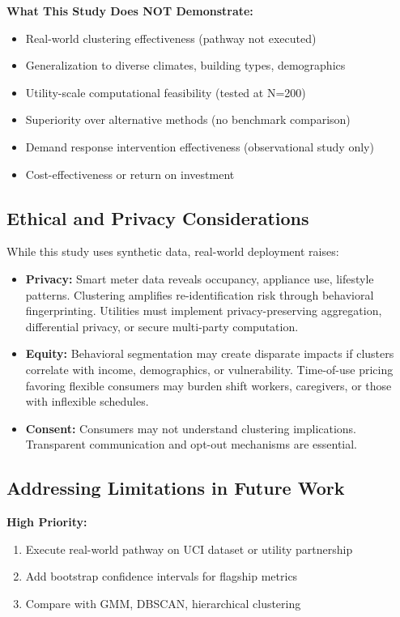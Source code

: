 \textbf{What This Study Does NOT Demonstrate:}
\begin{itemize}
    \item Real-world clustering effectiveness (pathway not executed)
    \item Generalization to diverse climates, building types, demographics
    \item Utility-scale computational feasibility (tested at N=200)
    \item Superiority over alternative methods (no benchmark comparison)
    \item Demand response intervention effectiveness (observational study only)
    \item Cost-effectiveness or return on investment
\end{itemize}

\subsection{Ethical and Privacy Considerations}

While this study uses synthetic data, real-world deployment raises:
\begin{itemize}
    \item \textbf{Privacy:} Smart meter data reveals occupancy, appliance use, lifestyle patterns. Clustering amplifies re-identification risk through behavioral fingerprinting. Utilities must implement privacy-preserving aggregation, differential privacy, or secure multi-party computation.
    \item \textbf{Equity:} Behavioral segmentation may create disparate impacts if clusters correlate with income, demographics, or vulnerability. Time-of-use pricing favoring flexible consumers may burden shift workers, caregivers, or those with inflexible schedules.
    \item \textbf{Consent:} Consumers may not understand clustering implications. Transparent communication and opt-out mechanisms are essential.
\end{itemize}

\subsection{Addressing Limitations in Future Work}

\textbf{High Priority:}
\begin{enumerate}
    \item Execute real-world pathway on UCI dataset or utility partnership
    \item Add bootstrap confidence intervals for flagship metrics
    \item Compare with GMM, DBSCAN, hierarchical clustering
\end{enumerate}


